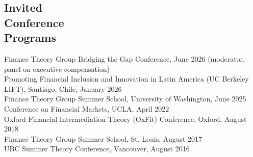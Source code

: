 \documentclass[margin,line,11pt]{resume}
\begin{document}
\begin{resume}
 \section{\mysidestyle Invited  \\ Conference \\ Programs} 
Finance Theory Group Bridging the Gap Conference, June 2026 (moderator, panel on executive compensation) \\
Promoting Financial Inclusion and Innovation in Latin America (UC Berkeley LIFT), Santiago, Chile, January 2026 \\
Finance Theory Group Summer School, University of Washington, June 2025 \\%
Conference on Financial Markets, UCLA, April 2022 \\
Oxford Financial Intermediation Theory (OxFit) Conference, Oxford, August 2018 \\%
Finance Theory Group Summer School, St. Louis, August 2017 \\ %
UBC Summer Theory Conference, Vancouver, August 2016 \\ %


\end{resume}
\end{document}
